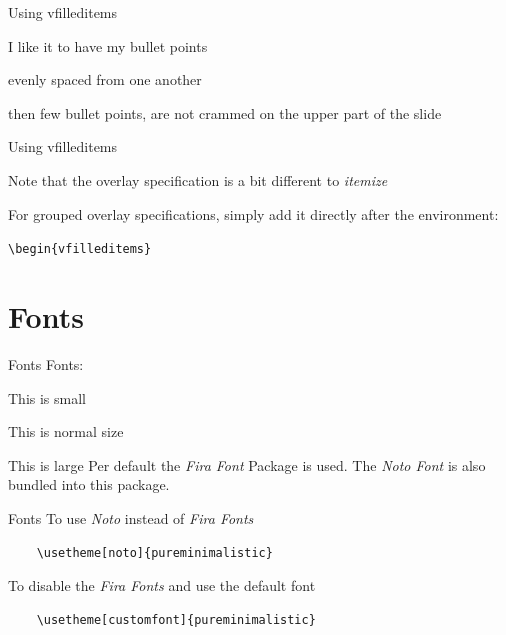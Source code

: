 \documentclass[aspectratio=169]{beamer}                    %
\begin{document}
\begin{frame}{Using vfilleditems}
    \begin{vfilleditems}
        \item I like it to have my bullet points
        \item evenly spaced from one another
        \item then few bullet points, are not crammed on
        the upper part of the slide
    \end{vfilleditems}
\end{frame}

\begin{frame}{Using vfilleditems}
    \begin{vfilleditems}
        \item Note that the overlay specification
        is a bit different to \emph{itemize}
        \item For grouped overlay specifications, simply add it
        directly after the environment:
        \begin{vfilleditems}
            \item \texttt{\textbackslash{}begin\{vfilleditems\}<+->}
        \end{vfilleditems}
    \end{vfilleditems}
\end{frame}


\section{Fonts}
\begin{frame}[fragile]{Fonts}
    Fonts:

    {\small This is small}

    This is normal size

        {\large This is large}
    \vfill
    Per default the \emph{Fira Font} Package is
    used. The \emph{Noto Font} is also bundled into this
    package.
\end{frame}

\begin{frame}[fragile]{Fonts}
    To use \emph{Noto} instead of \emph{Fira Fonts}
    \begin{verbatim}
    \usetheme[noto]{pureminimalistic}
  \end{verbatim}
    \vfill
    To disable the \emph{Fira Fonts} and use the default font
    \begin{verbatim}
    \usetheme[customfont]{pureminimalistic}
  \end{verbatim}
\end{frame}
\end{document}
